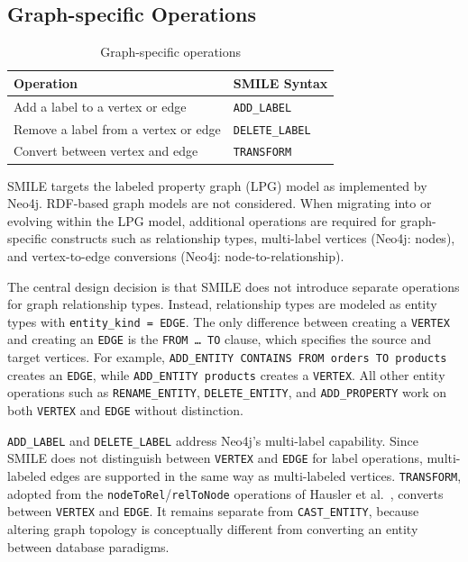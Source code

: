 \subsection{Graph-specific Operations}\label{subsec:op-graph}
  \begin{table}[h]
  \centering
  \small
  \begin{tabular}{ll}
  \toprule
  \textbf{Operation} & \textbf{SMILE Syntax} \\
  \midrule
  Add a label to a vertex or edge        & \texttt{ADD\_LABEL}    \\
  Remove a label from a vertex or edge   & \texttt{DELETE\_LABEL} \\
  Convert between vertex and edge        & \texttt{TRANSFORM}     \\
  \bottomrule
  \end{tabular}
  \caption{Graph-specific operations}
  \label{tab:ops-graph}
  \end{table}
  SMILE  targets the labeled property graph (LPG) model as implemented by Neo4j. RDF-based graph models are not considered.
  When migrating into or evolving within the LPG model, additional operations are required for graph-specific constructs such as relationship types, multi-label vertices (Neo4j: nodes), and vertex-to-edge conversions (Neo4j: node-to-relationship).

The central design decision is that SMILE  does not introduce separate operations for graph relationship types. Instead, relationship types are
modeled as entity types with \texttt{entity\_kind = EDGE}. The only difference between creating a \texttt{VERTEX} and creating an \texttt{EDGE} is the \texttt{FROM \ldots\ TO} clause, which specifies the source and target vertices. For example, \texttt{ADD\_ENTITY CONTAINS FROM orders TO
products} creates an \texttt{EDGE}, while \texttt{ADD\_ENTITY products} creates a \texttt{VERTEX}. All other entity operations such as
\texttt{RENAME\_ENTITY}, \texttt{DELETE\_ENTITY}, and \texttt{ADD\_PROPERTY} work on both \texttt{VERTEX} and \texttt{EDGE} without distinction.


\texttt{ADD\_LABEL} and \texttt{DELETE\_LABEL} address Neo4j's multi-label capability. Since SMILE
  does not distinguish between \texttt{VERTEX} and \texttt{EDGE} for label operations, multi-labeled
  edges are supported in the same way as multi-labeled vertices. \texttt{TRANSFORM}, adopted from the
  \texttt{nodeToRel}/\texttt{relToNode} operations of Hausler et al.~\cite{hausler2023language},
  converts between \texttt{VERTEX} and \texttt{EDGE}. It remains separate from \texttt{CAST\_ENTITY},
  because altering graph topology is conceptually different from converting an entity between
  database paradigms.




